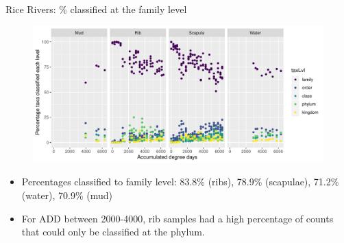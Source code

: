 \documentclass{beamer}
\begin{document}
\begin{frame}{Rice Rivers: \% classified at the family level}

  \begin{center}
    \begin{figure}
      \includegraphics[width=4.5in]{RiceRivers/bacteria/rr_family_perc_classif_by_add_type}
    \end{figure}
  \end{center}
  \vspace{-0.1in}
  {\footnotesize
  \begin{itemize}
    \item Percentages classified to family level: 83.8\% (ribs), 78.9\%
      (scapulae), 71.2\% (water), 70.9\% (mud)
    \item For ADD between 2000-4000, rib samples had a high percentage
      of counts that could only be classified at the phylum.
  \end{itemize}
  }
\end{frame}
\end{document}
